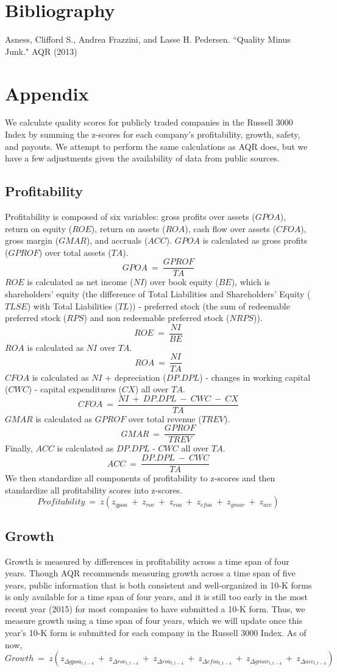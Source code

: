 \documentclass[titlepage]{article}
\begin{document}
\section*{Bibliography}
Asness, Clifford S., Andrea Frazzini, and Lasse H. Pedersen. ``Quality Minus Junk." AQR (2013)
\section*{Appendix}
We calculate quality scores for publicly traded companies in the Russell 3000 Index by summing the z-scores for each company's profitability, growth, safety, and payouts. We attempt to perform the same calculations as AQR does, but we have a few adjustments given the availability of data from public sources. 
\subsection*{Profitability}
Profitability is composed of six variables: gross profits over assets ($GPOA$), return on equity ($ROE$), return on assets ($ROA$), cash flow over assets ($CFOA$), gross margin ($GMAR$), and accruals ($ACC$). $GPOA$ is calculated as gross profits ($GPROF$) over total assets ($TA$). $$GPOA \ = \ \frac{GPROF}{TA}$$ $ROE$ is calculated as net income ($NI$) over book equity ($BE$), which is shareholders' equity (the difference of Total Liabilities and Shareholders' Equity ($TLSE$) with Total Liabilities ($TL$)) - preferred stock (the sum of redeemable preferred stock ($RPS$) and non redeemable preferred stock ($NRPS$)). $$ROE \ = \ \frac{NI}{BE}$$ $ROA$ is calculated as $NI$ over $TA$. $$ROA \ = \ \frac{NI}{TA}$$ $CFOA$ is calculated as $NI$ + depreciation ($DP.DPL$) - changes in working capital ($CWC$) - capital expenditures ($CX$) all over $TA$. $$CFOA \ = \ \frac{NI \ + \ DP.DPL \ - \ CWC \ - \ CX}{TA}$$ $GMAR$ is calculated as $GPROF$ over total revenue ($TREV$). $$GMAR \ = \ \frac{GPROF}{TREV}$$ Finally, $ACC$ is calculated as $DP.DPL$ - $CWC$ all over $TA$. $$ACC \ = \ \frac{DP.DPL \ - \ CWC}{TA}$$ We then standardize all components of profitability to z-scores and then standardize all profitability scores into z-scores. $$Profitability \ = \ z(z_{gpoa} \ + \ z_{roe} \ + \ z_{roa} \ + \ z_{cfoa} \ + \ z_{gmar} \ + \ z_{acc})$$
\subsection*{Growth}
Growth is measured by differences in profitability across a time span of four years. Though AQR recommends measuring growth across a time span of five years, public information that is both consistent and well-organized in 10-K forms is only available for a time span of four years, and it is still too early in the most recent year (2015) for most companies to have submitted a 10-K form. Thus, we measure growth using a time span of four years, which we will update once this year's 10-K form is submitted for each company in the Russell 3000 Index. As of now, $$Growth \ = \ z(z_{\Delta gpoa_{t,t-4}} \ + \ z_{\Delta roe_{t,t-4}} \ + \ z_{\Delta roa_{t,t-4}} \ + \ z_{\Delta cfoa_{t,t-4}} \ + \ z_{\Delta gmar_{t,t-4}} \ + \ z_{\Delta acc_{t,t-4}})$$
\end{document}
